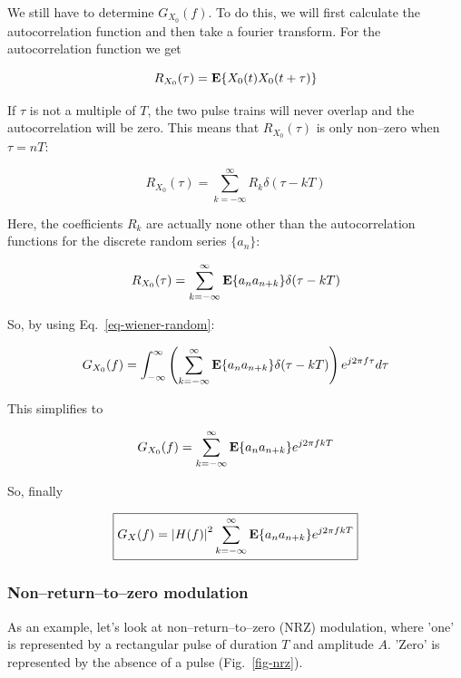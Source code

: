 We still have to determine $G_{X_0}(f)$. To do this, we will first calculate the autocorrelation function and then take a fourier transform. For the autocorrelation function we get

\begin{equation}
R_{X_0}(\tau) = {\bf E}\{X_0(t) X_0(t+\tau)\}
\end{equation}

If $\tau$ is not a multiple of $T$, the two pulse trains will never overlap and the autocorrelation will be zero. This means that $R_{X_0}(\tau)$ is only non--zero when $\tau=nT$:

\begin{equation}
R_{X_0}(\tau) = \sum_{k=-\infty}^{\infty}R_k \delta(\tau-kT)
\end{equation} 

Here, the coefficients $R_k$ are actually none other than the autocorrelation functions for the discrete random series $\{ a_n \}$:

\begin{equation}
R_{X_0}(\tau) = \sum_{k=-\infty}^{\infty} {\bf E} \{ a_n a_{n+k} \} \delta(\tau-kT)
\end{equation} 

So, by using Eq.~\ref{eq-wiener-random}:

\begin{equation}
G_{X_0}(f) = \int_{-\infty}^{\infty} \left ( \sum_{k=-\infty}^{\infty} {\bf E} \{ a_n a_{n+k} \} \delta(\tau-kT) \right ) e^{j 2 \pi f \tau} d \tau 
\end{equation} 

This simplifies to

\begin{equation}
G_{X_0}(f) =  \sum_{k=-\infty}^{\infty} {\bf E} \{ a_n a_{n+k} \}   e^{j 2 \pi f k T} 
\end{equation} 

So, finally

\begin{equation}
\fbox{$\displaystyle
G_X(f) =  \left | H(f) \right |^2 \sum_{k=-\infty}^{\infty} {\bf E} \{ a_n a_{n+k} \}   e^{j 2 \pi f k T} \label{eq-bb-psd}
$}
\end{equation} 

\subsubsection{Non--return--to--zero modulation}

As an example, let's look at non--return--to--zero (NRZ) modulation, where 'one' is represented by a rectangular pulse of duration $T$ and amplitude $A$. 'Zero' is represented by the absence of a pulse (Fig.~\ref{fig-nrz}).

